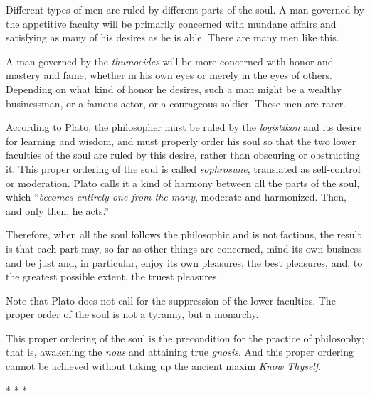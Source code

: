 Different types of men are ruled by different parts of the soul. A man governed by the appetitive faculty will be primarily concerned with mundane affairs and satisfying as many of his desires as he is able. There are many men like this.

A man governed by the \emph{thumoeides} will be more concerned with honor and mastery and fame, whether in his own eyes or merely in the eyes of others. Depending on what kind of honor he desires, such a man might be a wealthy businessman, or a famous actor, or a courageous soldier. These men are rarer.

According to Plato, the philosopher must be ruled by the \emph{logistikon} and its desire for learning and wisdom, and must properly order his soul so that the two lower faculties of the soul are ruled by this desire, rather than obscuring or obstructing it. This proper ordering of the soul is called \emph{sophrosune}, translated as self-control or moderation. Plato calls it a kind of harmony between all the parts of the soul, which ``\emph{becomes entirely one from the many}, moderate and harmonized. Then, and only then, he acts.''

\begin{quotex}
Therefore, when all the soul follows the philosophic and is not factious, the result is that each part may, so far as other things are concerned, mind its own business and be just and, in particular, enjoy its own pleasures, the best pleasures, and, to the greatest possible extent, the truest pleasures.
\end{quotex}


Note that Plato does not call for the suppression of the lower faculties. The proper order of the soul is not a tyranny, but a monarchy.

This proper ordering of the soul is the precondition for the practice of philosophy; that is, awakening the \emph{nous} and attaining true \emph{gnosis}. And this proper ordering cannot be achieved without taking up the ancient maxim \emph{Know Thyself}.



\begin{center}* * *\end{center}

